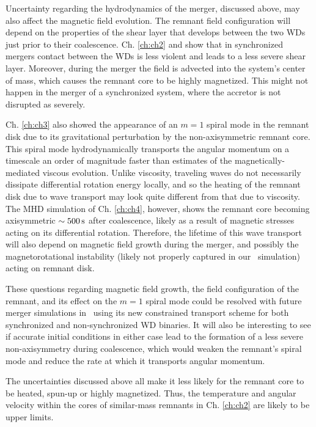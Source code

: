 Uncertainty regarding the hydrodynamics of the merger, discussed above, may also affect the magnetic field evolution.  The remnant field configuration will depend on the properties of the shear layer that develops between the two WDs just prior to their coalescence.  Ch. \ref{ch:ch2} and \cite{dan+14} show that in synchronized mergers contact between the WDs is less violent and leads to a less severe shear layer.  Moreover, during the merger the field is advected into the system's center of mass, which causes the remnant core to be highly magnetized.  This might not happen in the merger of a synchronized system, where the accretor is not disrupted as severely.

Ch. \ref{ch:ch3} also showed the appearance of an $m = 1$ spiral mode in the remnant disk due to its gravitational perturbation by the non-axisymmetric remnant core.  This spiral mode hydrodynamically transports the angular momentum on a timescale an order of magnitude faster than estimates of the magnetically-mediated viscous evolution.  Unlike viscosity, traveling waves do not necessarily dissipate differential rotation energy locally, and so the heating of the remnant disk due to wave transport may look quite different from that due to viscosity.  The MHD simulation of Ch. \ref{ch:ch4}, however, shows the remnant core becoming axisymmetric $\sim500\,\mathrm{s}$ after coalescence, likely as a result of magnetic stresses acting on its differential rotation.  Therefore, the lifetime of this wave transport will also depend on magnetic field growth during the merger, and possibly the magnetorotational instability (likely not properly captured in our \arepo\ simulation) acting on remnant disk.

These questions regarding magnetic field growth, the field configuration of the remnant, and its effect on the $m = 1$ spiral mode could be resolved with future merger simulations in \arepo\ using its new constrained transport scheme for both synchronized and non-synchronized WD binaries.  It will also be interesting to see if accurate initial conditions in either case lead to the formation of a less severe non-axisymmetry during coalescence, which would weaken the remnant's spiral mode and reduce the rate at which it transports angular momentum.  

The uncertainties discussed above all make it less likely for the remnant core to be heated, spun-up or highly magnetized.  Thus, the temperature and angular velocity within the cores of similar-mass remnants in Ch. \ref{ch:ch2} are likely to be upper limits.

